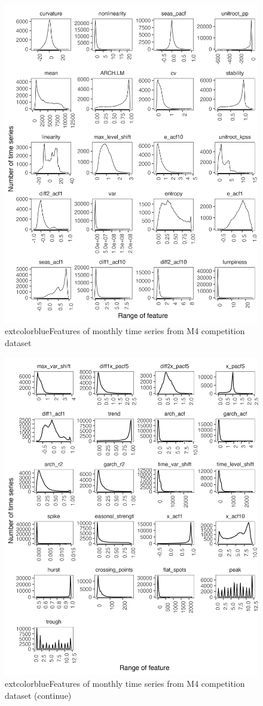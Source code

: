 \documentclass[preprint, 3p,
authoryear]{elsarticle} %
\begin{document}
\begin{figure}[H]

{\centering \includegraphics[width=0.7\linewidth]{img/300dpi/featurets_selection1} 

}

\caption{   extcolor{blue}{Features of monthly time series from M4 competition dataset} }\label{fig:feature1}
\end{figure}

\begin{figure}[H]

{\centering \includegraphics[width=0.7\linewidth]{img/300dpi/featurets_selection2} 

}

\caption{   extcolor{blue}{Features of monthly time series from M4 competition dataset (continue)} }\label{fig:feature2}
\end{figure}
\end{document}
